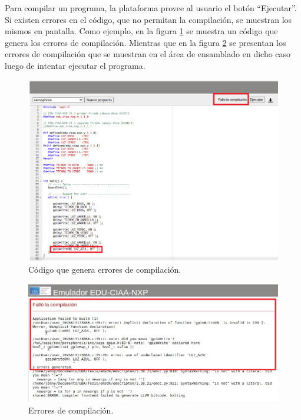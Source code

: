 Para compilar un programa, la plataforma provee al usuario el botón “Ejecutar”. Si existen errores en el código, que no permitan la compilación, se muestran los mismos en pantalla. Como ejemplo, en la figura \ref{fig:PlataformaErrores2} se muestra un código que genera los errores de compilación. Mientras que en la figura \ref{fig:PlataformaErrores1} se presentan los errores de compilación que se muestran en el área de ensamblado en dicho caso luego de intentar ejecutar el programa.

\begin{figure}[ht]
	\centering
	\includegraphics[scale=.42]{./Figures/PlataformaErrores1.png}
	\caption{Código que genera errores de compilación.}
	\label{fig:PlataformaErrores2}
\end{figure}

\begin{figure}[ht]
	\centering
	\includegraphics[scale=.39]{./Figures/PlataformaErrores2.png}
	\caption{Errores de compilación.}
	\label{fig:PlataformaErrores1}
\end{figure}

